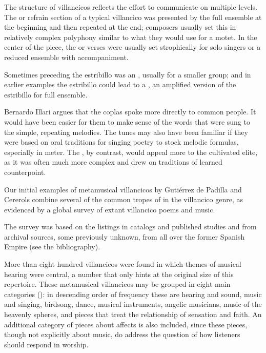 
The structure of villancicos reflects the effort to communicate on multiple
levels.
The  or refrain section of a typical villancico was presented
by the full ensemble at the beginning and then repeated at the end; composers
usually set this in relatively complex polyphony similar to what they would use
for a motet.
In the center of the piece, the  or verses were usually set
strophically for solo singers or a reduced ensemble with accompaniment.%
\begin{Footnote}
    Sometimes preceding the estribillo was an , usually for
    a smaller group; and in earlier examples the estribillo could lead to a
    , an amplified version of the estribillo for full
    ensemble.
\end{Footnote}
Bernardo Illari argues that the coplas spoke more directly to common people.%
    \Autocite{Illari:Popular}
It would have been easier for them to make sense of the words that were sung to
the simple, repeating melodies.
The tunes may also have been familiar if they were based on oral traditions for
singing poetry to stock melodic formulas, especially in  meter.
The , by contrast, would appeal more to the cultivated elite,
as it was often much more complex and drew on traditions of learned
counterpoint.


Our initial examples of metamusical villancicos by Gutiérrez de Padilla and
Cererols combine several of the common tropes of  in
the villancico genre, as evidenced by a global survey of extant villancico
poems and music.%
\begin{Footnote}
    The survey was based on the listings in catalogs and published studies and
    from archival sources, some previously unknown, from all over the former
    Spanish Empire (see the bibliography).
\end{Footnote}
More than eight hundred villancicos were found in which themes of musical
hearing were central, a number that only hints at the original size of this
repertoire.
These metamusical villancicos may be grouped in eight main categories
(): in descending order of frequency these are hearing and
sound, music and singing, birdsong, dance, musical instruments, angelic
musicians, music of the heavenly spheres, and pieces that treat the
relationship of sensation and faith.
An additional category of pieces about affects is also included, since these
pieces, though not explicitly about music, do address the question of how
listeners should respond in worship. 

